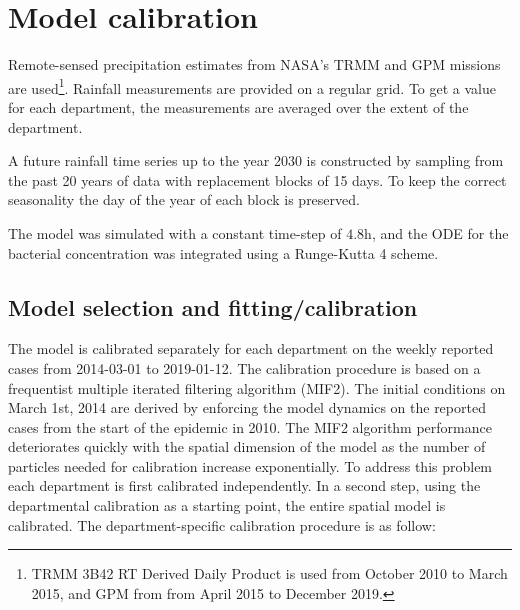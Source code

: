 \section{Model calibration}
Remote-sensed precipitation estimates from NASA's TRMM and GPM missions are used\footnote{TRMM 3B42 RT Derived Daily Product \parencite{Huffman:TRMMMultisatellitePrecipitation:2007} is used from October 2010 to March 2015,  and GPM from from April 2015 to December 2019.}. Rainfall measurements are provided on a regular grid. To get a value for each department, the measurements are averaged over the extent of the department.

A future rainfall time series up to the year 2030 is constructed by sampling from the past 20 years of data  with replacement blocks of 15 days. To keep the correct seasonality the day of the year of each block is preserved.

The model was simulated with a constant time-step of $4.8$h, and the ODE for the bacterial concentration was integrated using a Runge-Kutta 4 scheme.


\subsection{Model selection and fitting/calibration}



The model is calibrated separately for each department on the weekly reported cases from 2014-03-01 to 2019-01-12. The calibration procedure is based on a frequentist multiple iterated filtering algorithm (MIF2)\cite{Ionides:InferenceDynamicLatent:2015}. The initial conditions on March 1st, 2014 are derived by enforcing the model dynamics on the reported cases from the start of the epidemic in 2010. The MIF2 algorithm performance deteriorates quickly with the spatial dimension of the model as the number of particles needed for calibration increase exponentially\cite{Park:GuidedIntermediateResampling:2017}. To address this problem each department is first calibrated independently. In a second step, using the departmental calibration as a starting point, the entire spatial model is calibrated.
The department-specific calibration procedure is as follow:

